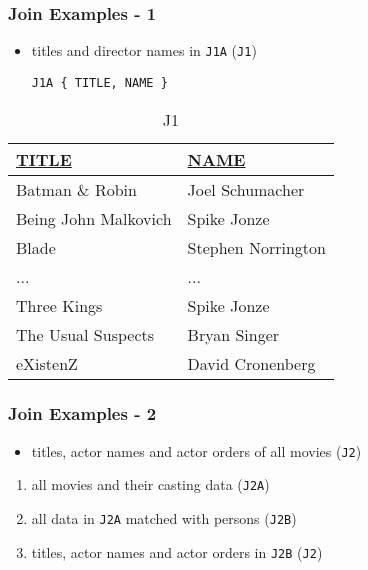 \documentclass[dvipsnames]{beamer}
\theoremstyle{plain}
\begin{document}
\begin{frame}[fragile]
  \frametitle{Join Examples - 1}

  \begin{itemize}
    \item titles and director names in \texttt{J1A}
      (\texttt{J1})
    \begin{lstlisting}
J1A { TITLE, NAME }
    \end{lstlisting}
  \end{itemize}

  \vspace{-10pt}
  \begin{tiny}
  \begin{table}
    \caption{J1}
    \begin{tabular}{|l|l|}\hline
\underline{TITLE}    & \underline{NAME}\\[2pt]\hline\hline
Batman \& Robin      & Joel Schumacher \\\hline
Being John Malkovich & Spike Jonze     \\\hline
Blade                & Stephen Norrington\\\hline
...                  & ...             \\\hline
Three Kings          & Spike Jonze     \\\hline
The Usual Suspects   & Bryan Singer    \\\hline
eXistenZ             & David Cronenberg\\\hline
    \end{tabular}
  \end{table}
  \end{tiny}
\end{frame}

\begin{frame}
  \frametitle{Join Examples - 2}

  \begin{itemize}
    \item titles, actor names and actor orders of all movies (\texttt{J2})
  \end{itemize}

  \pause
  \begin{enumerate}
    \item all movies and their casting data (\texttt{J2A})
    \item all data in \texttt{J2A} matched with persons (\texttt{J2B})
    \item titles, actor names and actor orders in \texttt{J2B} (\texttt{J2})
  \end{enumerate}
\end{frame}
\end{document}

